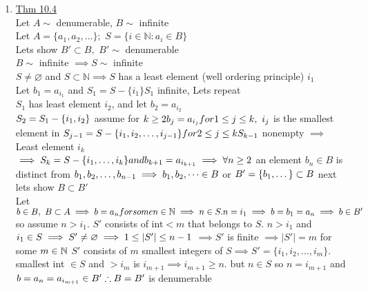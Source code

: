 \documentclass[12pt]{amsart}
\begin{document}
\begin{enumerate}
\item \underline{Thm 10.4}\\
Let $A \sim$ denumerable,$\,\, B \sim$ infinite\\
Let $A = \{ a_1, a_2, \dots \};\,\, S = \{ i \in \mathbb{N}: a_i \in B \}$\\
Lets show $B' \subset B,\,\, B' \sim$ denumerable\\
$B \sim$ infinite $\implies S \sim$ infinite\\
$S \neq \varnothing$ and $ S \subset \mathbb{N} \implies S$ has a least element (well ordering principle) $i_1$ \\
Let $b_1 = a_{i_1}$ and $S_1 = S- \{ i_1 \} S_1$ infinite, Lets repeat\\
$S_1$ has least element $i_2$, and let $b_2 = a_{i_2}$\\
$S_2 = S_1- \{ i_1, i_2 \}\\$
assume for $k \geq 2 b_j = a_{i_j}\\
for 1 \leq j \leq k,\,\, i_j$ is the smallest element in $S_{j-1} = S- \{i_1, i_2 , \dots , i_{j-1} \} for 2 \leq j \leq k\\
S_{k-1}$ nonempty $\implies$ Least element $i_k$\\
$\implies S_k = S- \{ i_1, \dots , i_k \} and b_{k+1} = a_{i_{k+1}}\\
\implies \forall n \geq 2$ an element $b_n \in B$ is distinct from $b_1, b_2 , \dots , b_{n-1} \implies b_1, b_2, \dots \in B\\$
or $B' = \{  b_1, \dots \} \subset B\\$
next lets show $B \subset B'$\\
Let $b \in B,\,\, B \subset A \implies b = a_n for some n \in \mathbb{N}\\
\implies n \in S. n = i_1 \implies b=b_1 = a_n \implies b \in B'\\$
so assume $n > i_1$. $S'$ consists of int$<m$ that belongs to $S$. $n>i_1$ and $i_1 \in S \implies S' \neq \varnothing\\
\implies 1 \leq | S' | \leq n-1\\$
$\implies S'$ is finite $\implies |S' | = m$ for some $m \in \mathbb{N}\\$
$S'$ consists of $m$ smallest integers of $S \implies S' = \{ i_1, i_2,\dots, i_m \}$. smallest int $\in S$ and $> i_m$ is $i_{m+1} \implies i_{m+1} \geq n$. but $n \in S$ so $n = i_{m+1}$ and $b=a_n = a_{i_{m+1}} \in B'\\
\therefore B=B'$ is denumerable\\



\end{enumerate}
\end{document}
